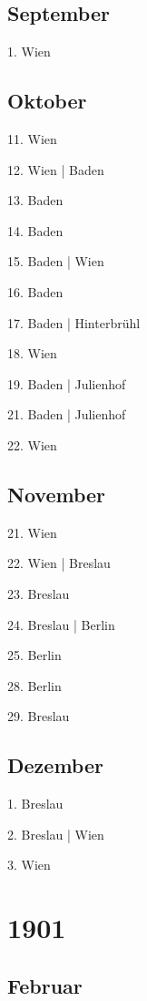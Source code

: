 \documentclass[twoside=false,titlepage=false,open=any, parskip=never, fontsize=10pt, headings=small, chapterprefix=false, appendixprefix=false, DIV=15]{scrbook}
\begin{document}
\begin{multicols}{3}
            \section*{September}
            1. Wien\par
            \section*{Oktober}
            11. Wien\par
            12. Wien | Baden\par
            13. Baden\par
            14. Baden\par
            15. Baden | Wien\par
            16. Baden\par
            17. Baden | Hinterbrühl\par
            18. Wien\par
            19. Baden | Julienhof\par
            21. Baden | Julienhof\par
            22. Wien\par
            \section*{November}
            21. Wien\par
            22. Wien | Breslau\par
            23. Breslau\par
            24. Breslau | Berlin\par
            25. Berlin\par
            28. Berlin\par
            29. Breslau\par
            \section*{Dezember}
            1. Breslau\par
            2. Breslau | Wien\par
            3. Wien\par
            \chapter*{1901}
            \section*{Februar}

\end{multicols}
\end{document}
